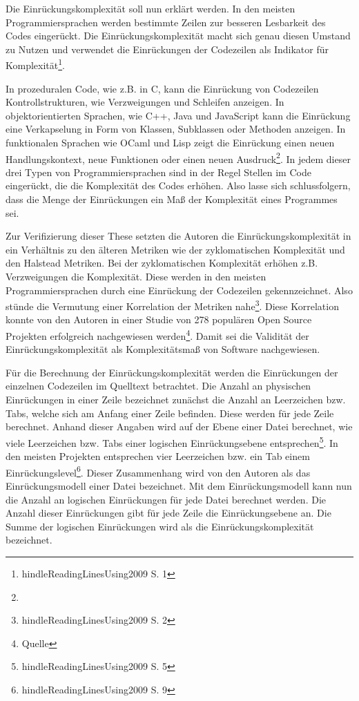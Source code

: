Die Einrückungskomplexität soll nun erklärt werden. In den meisten
Programmiersprachen werden bestimmte Zeilen zur besseren Lesbarkeit des
Codes eingerückt. Die Einrückungskomplexität macht sich genau diesen
Umstand zu Nutzen und verwendet die Einrückungen der Codezeilen als
Indikator für Komplexität\footnote{hindleReadingLinesUsing2009 S. 1}.

In prozeduralen Code, wie z.B. in C, kann die Einrückung von Codezeilen
Kontrollstrukturen, wie Verzweigungen und Schleifen anzeigen. In
objektorientierten Sprachen, wie C++, Java und JavaScript kann die
Einrückung eine Verkapselung in Form von Klassen, Subklassen oder
Methoden anzeigen. In funktionalen Sprachen wie OCaml und Lisp zeigt die
Einrückung einen neuen Handlungskontext, neue Funktionen oder einen
neuen Ausdruck\footnote{}. In jedem dieser drei Typen von
Programmiersprachen sind in der Regel Stellen im Code eingerückt, die
die Komplexität des Codes erhöhen. Also lasse sich schlussfolgern, dass
die Menge der Einrückungen ein Maß der Komplexität eines Programmes sei.

Zur Verifizierung dieser These setzten die Autoren die
Einrückungskomplexität in ein Verhältnis zu den älteren Metriken wie der
zyklomatischen Komplexität und den Halstead Metriken. Bei der
zyklomatischen Komplexität erhöhen z.B. Verzweigungen die Komplexität.
Diese werden in den meisten Programmiersprachen durch eine Einrückung
der Codezeilen gekennzeichnet. Also stünde die Vermutung einer
Korrelation der Metriken nahe\footnote{hindleReadingLinesUsing2009 S. 2}.
Diese Korrelation konnte von den Autoren in einer Studie von 278
populären Open Source Projekten erfolgreich nachgewiesen
werden\footnote{Quelle}. Damit sei die Validität der
Einrückungskomplexität als Komplexitätsmaß von Software nachgewiesen.

Für die Berechnung der Einrückungskomplexität werden die Einrückungen
der einzelnen Codezeilen im Quelltext betrachtet. Die Anzahl an
physischen Einrückungen in einer Zeile bezeichnet zunächst die Anzahl an
Leerzeichen bzw. Tabs, welche sich am Anfang einer Zeile befinden. Diese
werden für jede Zeile berechnet. Anhand dieser Angaben wird auf der
Ebene einer Datei berechnet, wie viele Leerzeichen bzw. Tabs einer
logischen Einrückungsebene entsprechen\footnote{hindleReadingLinesUsing2009
  S. 5}. In den meisten Projekten entsprechen vier Leerzeichen bzw. ein
Tab einem Einrückungslevel\footnote{hindleReadingLinesUsing2009 S. 9}.
Dieser Zusammenhang wird von den Autoren als das Einrückungsmodell einer
Datei bezeichnet. Mit dem Einrückungsmodell kann nun die Anzahl an
logischen Einrückungen für jede Datei berechnet werden. Die Anzahl
dieser Einrückungen gibt für jede Zeile die Einrückungsebene an. Die
Summe der logischen Einrückungen wird als die Einrückungskomplexität
bezeichnet.

